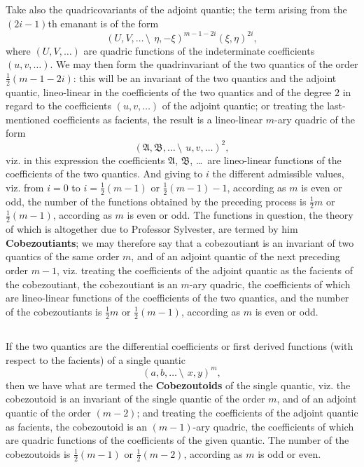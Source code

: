 \documentclass[12pt,a4paper]{article}
\begin{document}
Take also the quadricovariants of the adjoint quantic; the term arising from the $(2i-1)$th emanant is of the form
\[
(U, V, \ldots \,\setminus\!\!\:\, \eta, -\xi)^{m-1-2i}(\xi, \eta)^{2i},
\]
where $(U, V, \ldots)$ are quadric functions of the indeterminate coefficients $(u, v, \ldots)$. We may then form the quadrinvariant of the two quantics of the order $\frac{1}{2}(m - 1 - 2i)$: this will be an invariant of the two quantics and the adjoint quantic, lineo-linear in the coefficients of the two quantics and of the degree $2$ in regard to the coefficients $(u, v, \ldots)$ of the adjoint quantic; or treating the last-mentioned coefficients as facients, the result is a lineo-linear $m$-ary quadric of the form
\[
(\mathfrak{A}, \mathfrak{B}, \ldots \,\setminus\!\!\:\, u, v, \ldots)^2,
\]
viz. in this expression the coefficients $\mathfrak{A}$, $\mathfrak{B}$, \ldots\ are lineo-linear functions of the coefficients of the two quantics. And giving to $i$ the different admissible values, viz. from $i = 0$ to $i = \frac{1}{2}(m - 1)$ or $\frac{1}{2}(m - 1) - 1$, according as $m$ is even or odd, the number of the functions obtained by the preceding process is $\frac{1}{2}m$ or $\frac{1}{2}(m - 1)$, according as $m$ is even or odd. The functions in question, the theory of which is altogether due to Professor Sylvester, are termed by him \textbf{Cobezoutiants}; we may therefore say that a cobezoutiant is an invariant of two quantics of the same order $m$, and of an adjoint quantic of the next preceding order $m-1$, viz. treating the coefficients of the adjoint quantic as the facients of the cobezoutiant, the cobezoutiant is an $m$-ary quadric, the coefficients of which are lineo-linear functions of the coefficients of the two quantics, and the number of the cobezoutiants is $\frac{1}{2}m$ or $\frac{1}{2}(m - 1)$, according as $m$ is even or odd.

\subsection{}

If the two quantics are the differential coefficients or first derived functions (with respect to the facients) of a single quantic
\[
(a, b, \ldots \,\setminus\!\!\:\, x, y)^m,
\]
then we have what are termed the \textbf{Cobezoutoids} of the single quantic, viz. the cobezoutoid is an invariant of the single quantic of the order $m$, and of an adjoint quantic of the order $(m - 2)$; and treating the coefficients of the adjoint quantic as facients, the cobezoutoid is an $(m - 1)$-ary quadric, the coefficients of which are quadric functions of the coefficients of the given quantic. The number of the cobezoutoids is $\frac{1}{2}(m - 1)$ or $\frac{1}{2}(m - 2)$, according as $m$ is odd or even.
\end{document}
